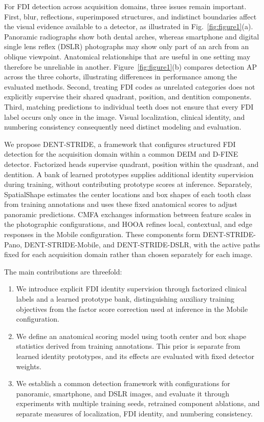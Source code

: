\documentclass[a4paper,fleqn]{cas-dc}
\begin{document}
For FDI detection across acquisition domains, three issues remain important. First, blur, reflections, superimposed structures, and indistinct boundaries affect the visual evidence available to a detector, as illustrated in Fig.~\ref{fig:figure1}(a). Panoramic radiographs show both dental arches, whereas smartphone and digital single lens reflex (DSLR) photographs may show only part of an arch from an oblique viewpoint. Anatomical relationships that are useful in one setting may therefore be unreliable in another. Figure~\ref{fig:figure1}(b) compares detection AP across the three cohorts, illustrating differences in performance among the evaluated methods. Second, treating FDI codes as unrelated categories does not explicitly supervise their shared quadrant, position, and dentition components. Third, matching predictions to individual teeth does not ensure that every FDI label occurs only once in the image. Visual localization, clinical identity, and numbering consistency consequently need distinct modeling and evaluation.

We propose DENT-STRIDE, a framework that configures structured FDI detection for the acquisition domain within a common DEIM and D-FINE detector. Factorized heads supervise quadrant, position within the quadrant, and dentition. A bank of learned prototypes supplies additional identity supervision during training, without contributing prototype scores at inference. Separately, SpatialShape estimates the center locations and box shapes of each tooth class from training annotations and uses these fixed anatomical scores to adjust panoramic predictions. CMFA exchanges information between feature scales in the photographic configurations, and HOOA refines local, contextual, and edge responses in the Mobile configuration. These components form DENT-STRIDE-Pano, DENT-STRIDE-Mobile, and DENT-STRIDE-DSLR, with the active paths fixed for each acquisition domain rather than chosen separately for each image.

The main contributions are threefold:
\begin{enumerate}
    \item We introduce explicit FDI identity supervision through factorized clinical labels and a learned prototype bank, distinguishing auxiliary training objectives from the factor score correction used at inference in the Mobile configuration.
    \item We define an anatomical scoring model using tooth center and box shape statistics derived from training annotations. This prior is separate from learned identity prototypes, and its effects are evaluated with fixed detector weights.
    \item We establish a common detection framework with configurations for panoramic, smartphone, and DSLR images, and evaluate it through experiments with multiple training seeds, retrained component ablations, and separate measures of localization, FDI identity, and numbering consistency.
\end{enumerate}
\end{document}
